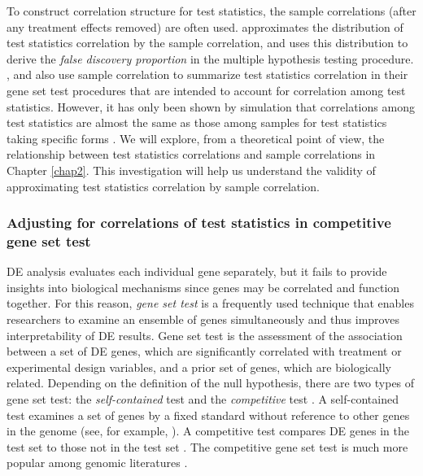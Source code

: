 To construct correlation structure for test statistics, the sample correlations (after any 
treatment effects removed) are often used. \citet{efron2007correlation} approximates the 
distribution of test statistics correlation by the sample correlation, and uses this distribution 
to  derive the \textit{false discovery proportion} in the multiple hypothesis testing procedure. 
\citet{barry2008statistical}, \citet{wu2012camera} and \citet{yaari2013quantitative} also use 
sample correlation to summarize test statistics correlation in their gene set test procedures that 
are intended to account for correlation among test statistics. However, it has only been shown by 
simulation that correlations among test statistics are almost the same as those among samples 
for test statistics taking specific forms \cite{barry2008statistical,efron2007correlation}. We 
will explore, from a theoretical point of view, the relationship between test statistics 
correlations and sample correlations in Chapter \ref{chap2}. This investigation will help us 
understand the validity of approximating test statistics correlation by sample correlation. 

\subsubsection{Adjusting for correlations of test statistics in competitive gene set test}
DE analysis evaluates each individual gene separately, but it fails to provide insights into
biological mechanisms since genes may be correlated and function together. %
For this reason, \textit{gene set test} is a frequently used technique that enables
researchers to examine an ensemble of genes simultaneously and thus improves interpretability of DE
results. Gene set test is the assessment of
the association between a set of DE genes, which are significantly correlated with
treatment or experimental design variables, and a prior set of genes, which are biologically
related. Depending on the definition of the null hypothesis, there are two types of gene set test:
the \textit{self-contained} test and the \textit{competitive} test \citep{goeman2007analyzing}. A
self-contained test examines a set of genes by a fixed standard without reference to other genes in
the genome (see, for example, \cite{goeman2005testing,goeman2004global, huang2013gene,
	tsai2009multivariate, wu2010roast}). A competitive test compares DE
genes in the test set to those not in the test set
\citep{tian2005discovering,wu2012camera,yaari2013quantitative}. The competitive gene set test is
much more popular among genomic literatures \citep{gatti2010heading,goeman2007analyzing}.  


